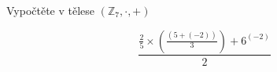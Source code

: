 \subsubsection{}
Vypočtěte v tělese $(\mathbb{Z}_{7}, \cdot ,+)$

$$\frac{\frac{2}{5}\times \left ( \frac{\left ( 5+(-2) \right )}{3} \right )+6^{(-2)}}{2}$$
